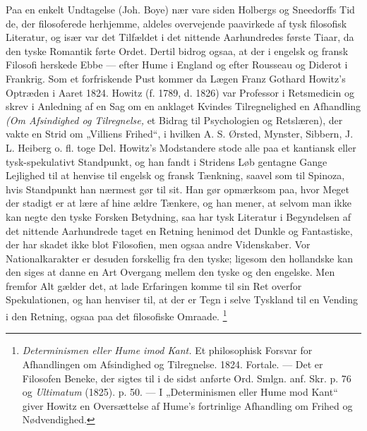 \documentclass[12pt,a4paper,openany]{book}
\newcommand{\opage}[1]{\marginnote{\footnotesize\textit{[#1]}}}
\begin{document}
Paa en enkelt Undtagelse (Joh. Boye) nær vare siden Holbergs og Sneedorffs Tid
de, der filosoferede herhjemme, aldeles overvejende paavirkede af tysk
filosofisk Literatur, og især var det Tilfældet i det nittende Aarhundredes
første Tiaar, da den tyske Romantik førte Ordet. Dertil bidrog ogsaa, at der i
engelsk og fransk Filosofi herskede Ebbe --- efter Hume i England og efter
Rousseau og Diderot i Frankrig. Som et forfriskende Pust kommer da Lægen Franz
Gothard Howitz's Optræden i Aaret 1824. Howitz (f. 1789, d. 1826) var Professor
i Retsmedicin og skrev i Anledning af en Sag om en anklaget Kvindes
Tilregnelighed en Afhandling \textit{(Om Afsindighed og Tilregnelse,} et Bidrag
til Psychologien og Retslæren), der vakte en Strid om „Villiens Frihed“, i
hvilken A. S. Ørsted, Mynster, Sibbern, J. L. Heiberg o. fl. toge Del. Howitz's
Modstandere stode alle paa et kantiansk eller tysk-spekulativt Standpunkt, og
han fandt i Stridens Løb gentagne Gange Lejlighed til at henvise til engelsk og
fransk Tænkning, saavel som til Spinoza, hvis Standpunkt han nærmest gør til
sit. Han gør opmærksom paa, hvor Meget der stadigt er at lære af hine ældre
Tænkere, og han mener, at selvom man ikke kan negte den tyske Forsken
Betydning, saa har tysk Literatur i Begyndelsen af det nittende Aarhundrede
taget en Retning henimod det Dunkle og Fantastiske, der har skadet ikke blot
Filosofien, men ogsaa andre Videnskaber. Vor Nationalkarakter er desuden
forskellig fra den tyske; ligesom den hollandske kan den siges at danne en Art
Overgang mellem den tyske og den engelske. Men fremfor
\setcounter{footnote}{0}%
\opage{82}Alt gælder det, at lade Erfaringen komme til sin Ret overfor
Spekulationen, og han henviser til, at der er Tegn i selve Tyskland til en
Vending i den Retning, ogsaa paa det filosofiske Omraade.%
\footnote[1]{\textit{Determinismen eller Hume imod Kant.} Et philosophisk
Forsvar for Afhandlingen om Afsindighed og Tilregnelse. 1824. Fortale. --- Det
er Filosofen Beneke, der sigtes til i de sidst anførte Ord. Smlgn. anf. Skr. p.
76 og \textit{Ultimatum} (1825). p. 50. --- I „Determinismen eller Hume mod
Kant“ giver Howitz en Oversættelse af Hume's fortrinlige Afhandling om Frihed
og Nødvendighed.}
\end{document}

